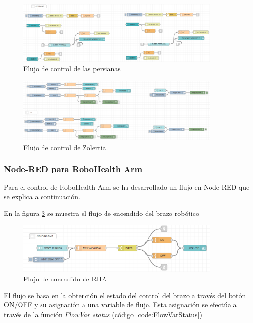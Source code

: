 \begin{figure}[tb]
\centering
\includegraphics[width=0.9\textwidth]{figuras/persianasFlow.png}
\caption{Flujo de control de las persianas}
\label{fig:persianasFlow}
\end{figure}

\begin{figure}[tb]
\centering
\includegraphics[width=0.9\textwidth]{figuras/zolertiaFlow.png}
\caption{Flujo de control de Zolertia}
\label{fig:zolertiaFlow}
\end{figure}

\subsubsection{Node-RED para RoboHealth Arm}

Para el control de RoboHealth Arm se ha desarrollado un flujo en Node-RED que se explica a continuación.

En la figura \ref{fig:ONOFFRHA} se muestra el flujo de encendido del brazo robótico

\begin{figure}[H]
\centering
\includegraphics[width=0.9\textwidth]{figuras/ONOFFFlowRHA.png}
\caption{Flujo de encendido de RHA}
\label{fig:ONOFFRHA}
\end{figure}

El flujo se basa en la obtención el estado del control del brazo a través del botón ON/OFF y su asignación a una variable de flujo. Esta asignación se efectúa a través de la función \textit{FlowVar status} (código \ref{code:FlowVarStatus})

